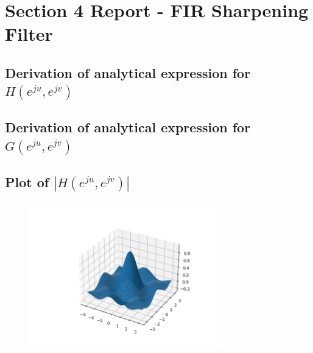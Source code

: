 \documentclass{article}
\begin{document}
\section{Section 4 Report - FIR Sharpening Filter}
\subsection{Derivation of analytical expression for $H(e^{ju}, e^{jv})$}
\subsection{Derivation of analytical expression for $G(e^{ju}, e^{jv})$}
\subsection{Plot of $|H(e^{ju}, e^{jv})|$}
\begin{figure}[H]
    \centering
    \includegraphics[width=0.75\textwidth]{../results/section4-H-python.png}
    \begin{center}
    \end{center}
    \label{fig:A1}
\end{figure}
\end{document}
